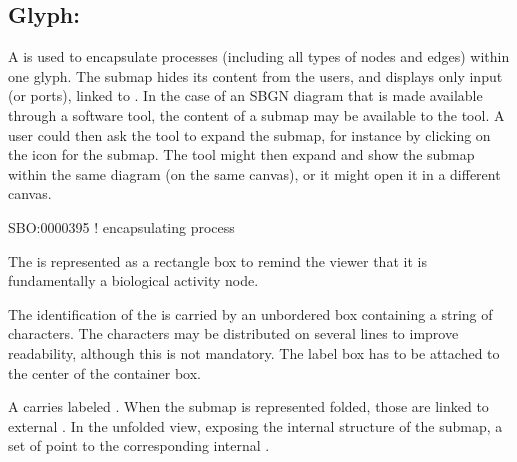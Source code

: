 \subsection{Glyph: }
\label{sec:submap}

A  is used to encapsulate processes (including all types of nodes and edges) within one glyph.  The submap hides its content from the users, and displays only input  (or ports), linked to . In the case of an SBGN diagram that is made available through a software tool, the content of a submap may be available to the tool.  A user could then ask the tool to expand the submap, for instance by clicking on the icon for the submap.  The tool might then expand and show the submap within the same diagram (on the same canvas), or it might open it in a different canvas.

\begin{glyphDescription}

\glyphSboTerm SBO:0000395 ! encapsulating process

\glyphContainer The  is represented as a rectangle box to remind the viewer that it is fundamentally a biological activity node.

\glyphLabel The identification of the  is carried by an unbordered box containing a string of characters.  The characters may be distributed on several lines to improve readability, although this is not mandatory.  The label box has to be attached to the center of the container box.

\glyphAux A  carries labeled .  When the submap is represented folded, those  are linked to external .  In the unfolded view, exposing the internal structure of the submap, a set of  point to the corresponding internal .

\end{glyphDescription}

